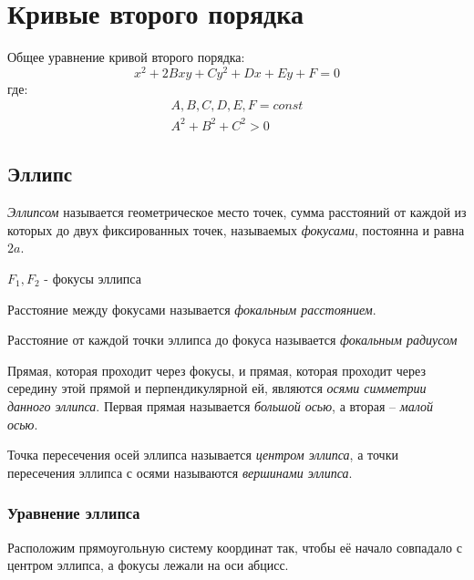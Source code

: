 \section{Кривые второго порядка}

Общее уравнение кривой второго порядка:
\[
  \boxed{x^2 + 2Bxy + Cy^2 + Dx + Ey + F = 0}
\] 
где:
\begin{gather*}
  A, B, C, D, E, F = const \\
  A^2 + B^2 + C^2 > 0
\end{gather*}

\subsection{Эллипс}

\begin{definition}
  \textit{Эллипсом} называется геометрическое место точек, сумма расстояний от каждой из которых до двух фиксированных точек, называемых \textit{фокусами}, постоянна и равна $2a$.
\end{definition}

$F_1, F_2$ - фокусы эллипса

Расстояние между фокусами называется \textit{фокальным расстоянием}.

Расстояние от каждой точки эллипса до фокуса называется \textit{фокальным радиусом} 

Прямая, которая проходит через фокусы, и прямая, которая проходит через середину этой прямой и перпендикулярной ей, являются \textit{осями симметрии данного эллипса}.
Первая прямая называется \textit{большой осью}, а вторая -- \textit{малой осью}.   

Точка пересечения осей эллипса называется \textit{центром эллипса}, а точки пересечения эллипса с осями называются \textit{вершинами эллипса}. 

\subsubsection*{Уравнение эллипса}

Расположим прямоугольную систему координат так, чтобы её начало совпадало с центром эллипса, а фокусы лежали на оси абцисс.

